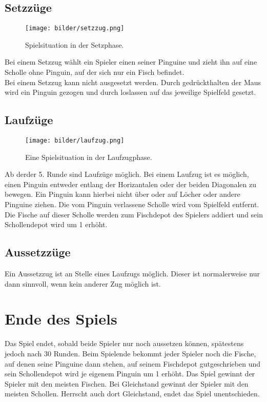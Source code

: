 \documentclass[a4paper, ngerman]{scrartcl}
\begin{document}
	
	
	\subsection{Setzzüge}
	
	\begin{figure}[h!]
		\centering
		\texttt{[image: bilder/setzzug.png]}
		\caption{Spielsituation in der Setzphase.}
		\label{fig:Setzzug}
	\end{figure}
	Bei einem Setzzug wählt ein Spieler einen seiner
	Pinguine und zieht ihn auf eine Scholle ohne Pinguin, auf der sich nur ein
	Fisch befindet.\\
	Bei einem Setzzug kann nicht ausgesetzt werden. Durch gedrückthalten der Maus
	wird ein Pinguin gezogen und durch loslassen auf das jeweilige Spielfeld
	gesetzt.
	
	
	 
\subsection{Laufzüge}
	 
	\begin{figure}[h!]
		\centering
		\texttt{[image: bilder/laufzug.png]}
		\caption{Eine Spielsituation in der Laufzugphase.}
		\label{fig:Laufzug}
	\end{figure}
	
Ab derder 5. Runde sind Laufzüge möglich. Bei einem Laufzug
ist es möglich, einen Pinguin entweder entlang der Horizantalen oder der beiden
Diagonalen zu bewegen. Ein Pinguin kann hierbei nicht über oder auf Löcher oder
andere Pinguine ziehen. Die vom Pinguin verlassene Scholle wird vom Spielfeld entfernt.
Die Fische auf dieser Scholle werden zum Fischdepot des Spielers addiert und sein 
Schollendepot wird um 1 erhöht.



\subsection{Aussetzzüge}
Ein Aussetzzug ist an Stelle eines Laufzugs möglich. Dieser ist normalerweise
nur dann sinnvoll, wenn kein anderer Zug möglich ist.

	
\section{Ende des Spiels} 
	Das Spiel endet, sobald beide Spieler nur noch aussetzen können, 
	spätestens jedoch nach 30 Runden.  Beim Spielende bekommt jeder 
	Spieler noch die Fische, auf denen seine Pinguine dann stehen, 
	auf seinem Fischdepot gutgeschrieben und sein Schollendepot wird 
	je eigenem Pinguin um 1 erhöht.
	Das Spiel gewinnt der Spieler mit den meisten Fischen. Bei Gleichstand gewinnt
	der Spieler mit den meisten Schollen. Herrscht auch dort Gleichstand, endet das
	Spiel unentschieden.
	
\end{document}
